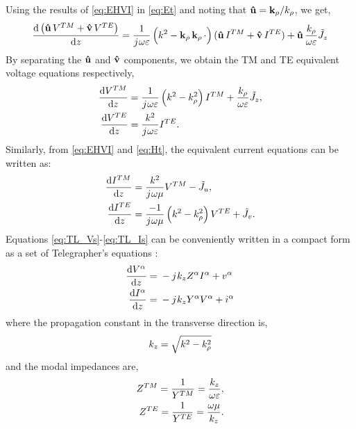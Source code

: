 \documentclass[11pt]{article}
\begin{document}
%
Using the results of \eqref{eq:EHVI} in \eqref{eq:Et} and noting that $\mathbf{\hat u} = \mathbf{k_{\rho}}/k_{\rho}$, we get,
%
\begin{equation}
  \dv{\left(\mathbf{\hat u} \, V^{TM} + \mathbf{\hat v} \,V^{TE} \right)}{z} = \frac{1}{j\mkern1mu \omega \varepsilon}\left( k^2 - \mathbf{k_{\rho}} \,\mathbf{k_{\rho}} \,\cdot \right) (\mathbf{\hat u}\, I^{TM} + \mathbf{\hat v} \, I^{TE}) + \mathbf{\hat u} \, \frac{k_{\rho}}{\omega \varepsilon} \tilde{J}_z
  \label{eq:Vinuv}
\end{equation}
%
By separating the $\mathbf{\hat u}$ and $\mathbf{\hat v}$ components, we obtain the TM and TE equivalent voltage equations respectively,
%
\begin{subequations}
  \begin{align}
    \dv{V^{TM}}{z} ={}&
    \frac{1}{j\mkern1mu \omega \varepsilon}\left( k^2 - k_{\rho}^2 \right)I^{TM} + \frac{k_{\rho}}{\omega \varepsilon} \tilde{J}_z,
    \label{eq:V_TM}\\
    \dv{V^{TE}}{z} ={}&
    \frac{k^2}{j\mkern1mu \omega \varepsilon} I^{TE}.
    \label{eq:V_TE}
  \end{align}
  \label{eq:TL_Vs}%
\end{subequations}
%
Similarly, from \eqref{eq:EHVI} and \eqref{eq:Ht}, the equivalent current equations can be written as:
%
\begin{subequations}
  \begin{align}
    \dv{I^{TM}}{z} ={}&
    \frac{k^2}{j\mkern1mu \omega \mu} V^{TM} - \tilde{J}_u,
    \label{eq:I_TM}\\
    \dv{I^{TE}}{z} ={}&
    \frac{-1}{j\mkern1mu \omega \mu}\left( k^2 - k_{\rho}^2 \right)V^{TE} + \tilde{J}_v.
    \label{eq:I_TE}
  \end{align}
  \label{eq:TL_Is}%
\end{subequations}
%
Equations \eqref{eq:TL_Vs}-\eqref{eq:TL_Is} can be conveniently written in a compact form as a set of Telegrapher's equations \cite[p. 1166]{michalski2005}:
%
\begin{subequations}
  \begin{align}
    \dv{V^{\alpha}}{z} ={}& -j\mkern1mu k_z Z^{\alpha}I^{\alpha} + v^{\alpha}
    \label{eq:TL_V}\\
    \dv{I^{\alpha}}{z} ={}& -j\mkern1mu k_z Y^{\alpha}V^{\alpha} + i^{\alpha}
    \label{eq:TL_I}
  \end{align}
  \label{eq:TLE}%
\end{subequations}
%
where the propagation constant in the transverse direction is,
%
\begin{equation}
  k_z = \sqrt{k^2 - k_{\rho}^2}
  \label{eq:k_z}
\end{equation}
%
and the modal impedances are,
%
\begin{subequations}
  \begin{align}
    Z^{TM} = \frac{1}{Y^{TM}} = \frac{k_z}{\omega \varepsilon},
    \label{eq:z_tm}\\
    Z^{TE} = \frac{1}{Y^{TE}} = \frac{\omega \mu}{k_z}.
    \label{eq:z_te}
  \end{align}
  \label{eq:Z}%
\end{subequations}
\end{document}
